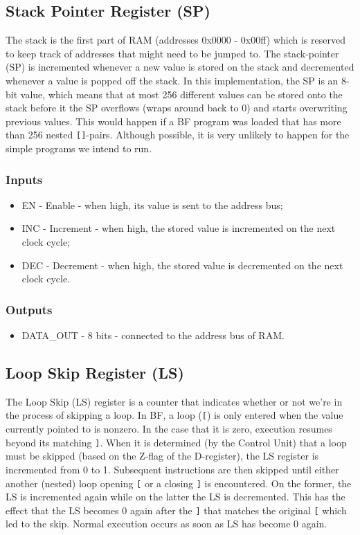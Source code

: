 \subsection{Stack Pointer Register (SP)} \label{sec:architecturehitecture:sp}
The stack is the first part of RAM (addresses 0x0000 - 0x00ff) which is reserved to keep track of addresses that might need to be jumped to. The stack-pointer (SP) is incremented whenever a new value is stored on the stack and decremented whenever a value is popped off the stack. In this implementation, the SP is an 8-bit value, which means that at most 256 different values can be stored onto the stack before it the SP overflows (wraps around back to 0) and starts overwriting previous values. This would happen if a BF program was loaded that has more than 256 nested \texttt{[]}-pairs. Although possible, it is very unlikely to happen for the simple programs we intend to run.

\subsubsection*{Inputs}
\begin{itemize}
\itemsep0em 
\item EN - Enable - when high, its value is sent to the address bus;
\item INC - Increment - when high, the stored value is incremented on the next clock cycle;
\item DEC - Decrement - when high, the stored value is decremented on the next clock cycle.
\end{itemize}

\subsubsection*{Outputs}
\begin{itemize}
\itemsep0em 
\item DATA\_OUT - 8 bits - connected to the address bus of RAM.
\end{itemize}

\subsection{Loop Skip Register (LS)} \label{sec:architecture:ls}
The Loop Skip (LS) register is a counter that indicates whether or not we're in the process of skipping a loop. In BF, a loop (\texttt{[}) is only entered when the value currently pointed to is nonzero. In the case that it is zero, execution resumes beyond its matching \texttt{]}. When it is determined (by the Control Unit) that a loop must be skipped (based on the Z-flag of the D-register), the LS register is incremented from 0 to 1. Subsequent instructions are then skipped until either another (nested) loop opening \texttt{[} or a closing \texttt{]} is encountered. On the former, the LS is incremented again while on the latter the LS is decremented. This has the effect that the LS becomes 0 again after the \texttt{]} that matches the original \texttt{[} which led to the skip. Normal execution occurs as soon as LS has become 0 again.

